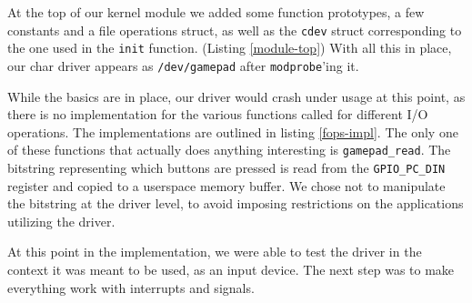 At the top of our kernel module we added some function prototypes, a few constants and a file operations struct, as well as the \texttt{cdev} struct corresponding to the one used in the \texttt{init} function. (Listing \ref{module-top})
With all this in place, our char driver appears as \texttt{/dev/gamepad} after \texttt{modprobe}'ing it.


While the basics are in place, our driver would crash under usage at this point, as there is no implementation for the various functions called for different I/O operations. The implementations are outlined in listing \ref{fops-impl}. The only one of these functions that actually does anything interesting is \texttt{gamepad\_read}. The bitstring representing which buttons are pressed is read from the \texttt{GPIO\_PC\_DIN} register and copied to a userspace memory buffer. We chose not to manipulate the bitstring at the driver level, to avoid imposing restrictions on the applications utilizing the driver.

At this point in the implementation, we were able to test the driver in the context it was meant to be used, as an input device. The next step was to make everything work with interrupts and signals.

